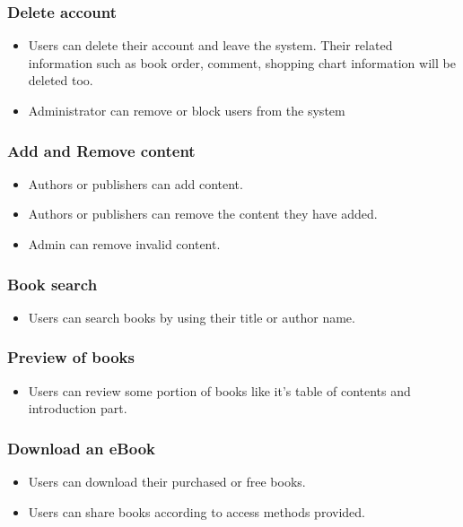 	\subsubsection{Delete account}
	\begin{itemize}
		\item Users can delete their account and leave the system. Their related information such as book order, comment, shopping chart information will be deleted too.
		\item Administrator can remove or block users from the system
	\end{itemize}

	\subsubsection{Add and Remove content}
	\begin{itemize}
		\item Authors or publishers can add content.
		\item Authors or publishers can remove the content they have added.
		\item Admin can remove invalid content.
	\end{itemize}


	\subsubsection{Book search}
	\begin{itemize}
		\item Users can search books by using their title or author name.
	\end{itemize}

	\subsubsection{Preview of books}
	\begin{itemize}
		\item Users can review some portion of books like it's table of contents and introduction part.
	\end{itemize}

	\subsubsection{Download an eBook}
	\begin{itemize}
		\item Users can download their purchased or free books.
		\item Users can share books according to access methods provided.
	\end{itemize}

